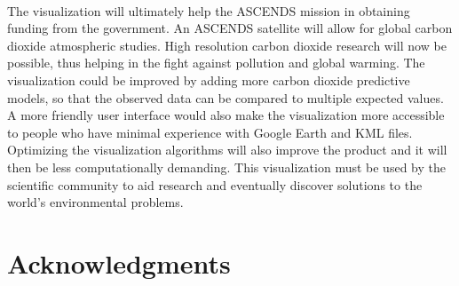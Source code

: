 \documentclass[12pt,letterpaper]{report}
\begin{document}
  \paragraph{}
   The visualization will ultimately help the ASCENDS mission in obtaining funding from the government.  An ASCENDS satellite will allow for global carbon dioxide atmospheric studies.  High resolution carbon dioxide research will now be possible, thus helping in the fight against pollution and global warming.  The visualization could be improved by adding more carbon dioxide predictive models, so that the observed data can be compared to multiple expected values.  A more friendly user interface would also make the visualization more accessible to people who have minimal experience with Google Earth and KML files.  Optimizing the visualization algorithms will also improve the product and it will then be less computationally demanding.  This visualization must be used by the scientific community to aid research and eventually discover solutions to the world's environmental problems.

 \section*{Acknowledgments}
\end{document}

